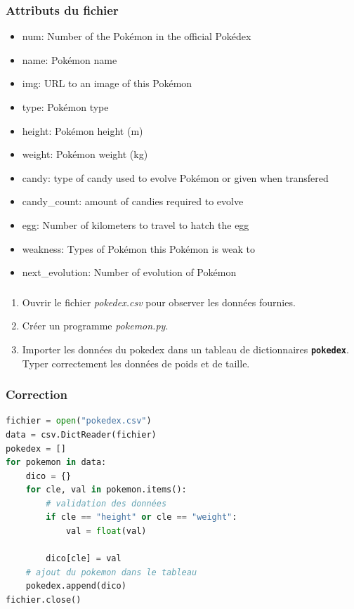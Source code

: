 \documentclass[svgnames,11pt]{beamer}
\begin{document}
\begin{frame}
    \frametitle{Attributs du fichier}

    \begin{itemize}
        \item num: Number of the Pokémon in the official Pokédex
        \item name: Pokémon name
        \item img: URL to an image of this Pokémon
        \item type: Pokémon type
        \item height: Pokémon height (m)
        \item weight: Pokémon weight (kg)
        \item candy: type of candy used to evolve Pokémon or given when transfered
        \item candy\_count: amount of candies required to evolve
        \item egg: Number of kilometers to travel to hatch the egg
        \item weakness: Types of Pokémon this Pokémon is weak to
        \item next\_evolution: Number of evolution of Pokémon
    \end{itemize}

\end{frame}

\begin{frame}
    \frametitle{}

    \begin{activite}
        \begin{enumerate}
            \item Ouvrir le fichier \emph{pokedex.csv} pour observer les données fournies.
            \item Créer un programme \emph{pokemon.py}.
            \item Importer les données du pokedex dans un tableau de dictionnaires \textbf{\texttt{pokedex}}. Typer correctement les données de poids et de taille.
        \end{enumerate}
    \end{activite}

\end{frame}
\begin{frame}[fragile]
    \frametitle{Correction}

    \begin{center}
        \begin{lstlisting}[language=Python,basicstyle=\small]
fichier = open("pokedex.csv")
data = csv.DictReader(fichier)
pokedex = []
for pokemon in data:
    dico = {}
    for cle, val in pokemon.items():
        # validation des données
        if cle == "height" or cle == "weight":
            val = float(val)

        dico[cle] = val
    # ajout du pokemon dans le tableau
    pokedex.append(dico)
fichier.close()
\end{lstlisting}
        \label{CODE}
    \end{center}

\end{frame}
\end{document}
